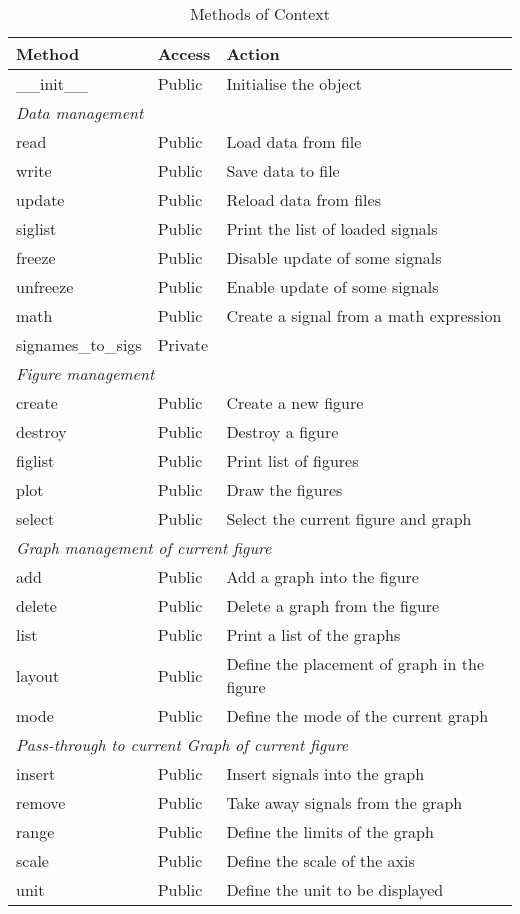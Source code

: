 \documentclass[a4paper,11pt]{article}
\begin{document}
\begin{table}[htbp]
  \centering\sf\small
  \begin{tabular}{lll}
    \hline
    Method & Access & Action \\
    \hline
    \_\_init\_\_ & Public & Initialise the object \\
    \multicolumn{3}{l}{\textit{Data management}} \\
    read & Public & Load data from file\\
    write &Public & Save data to file \\
    update & Public & Reload data from files\\
    siglist & Public & Print the list of loaded signals\\
    freeze & Public & Disable update of some signals\\
    unfreeze & Public & Enable update of some signals\\
    math & Public & Create a signal from a math expression\\
    signames\_to\_sigs & Private\\
    \multicolumn{3}{l}{\textit{Figure management}} \\
    create & Public & Create a new figure\\
    destroy & Public & Destroy a figure \\
    figlist & Public & Print list of figures \\
    plot & Public & Draw the figures\\    
    select & Public & Select the current figure and graph \\
    \multicolumn{3}{l}{\textit{Graph management of current figure}} \\
    add & Public & Add a graph into the figure \\
    delete & Public & Delete a graph from the figure \\
    list & Public & Print a list of the graphs\\
    layout & Public & Define the placement of graph in the figure\\
    mode & Public & Define the mode of the current graph\\
    \multicolumn{3}{l}{\textit{Pass-through to current Graph of current figure}} \\
    insert & Public & Insert signals into the graph\\
    remove & Public & Take away signals from the graph\\
    range & Public & Define the limits of the graph\\
    scale & Public & Define the scale of the axis\\
    unit & Public & Define the unit to be displayed\\
    \hline
  \end{tabular}
  \caption{Methods of Context}
  \label{tab:ctxt:meth}
\end{table}
\end{document}
